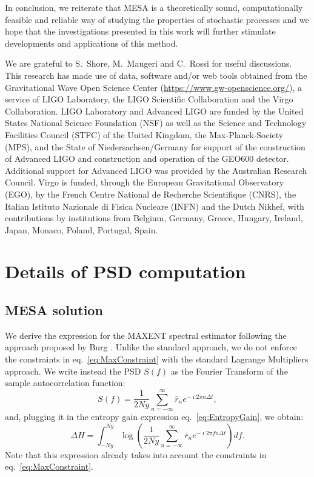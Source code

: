 \documentclass[twocolumn,showpacs,preprintnumbers,nofootinbib,prd,
superscriptaddress,10pt]{revtex4-1}
\begin{document}
In conclusion, we reiterate that MESA is a theoretically sound, computationally feasible and reliable way of studying the properties of stochastic processes and we hope that the investigations presented in this work will further stimulate developments and applications of this method.


\begin{acknowledgments}
We are grateful to S.~Shore, M.~Maugeri and C.~Rossi for useful discussions.\\
This research has made use of data, software and/or web tools obtained from the Gravitational Wave Open Science Center (\url{https://www.gw-openscience.org/}), a service of LIGO Laboratory, the LIGO Scientific Collaboration and the Virgo Collaboration. LIGO Laboratory and Advanced LIGO are funded by the United States National Science Foundation (NSF) as well as the Science and Technology Facilities Council (STFC) of the United Kingdom, the Max-Planck-Society (MPS), and the State of Niedersachsen/Germany for support of the construction of Advanced LIGO and construction and operation of the GEO600 detector. Additional support for Advanced LIGO was provided by the Australian Research Council. Virgo is funded, through the European Gravitational Observatory (EGO), by the French Centre National de Recherche Scientifique (CNRS), the Italian Istituto Nazionale di Fisica Nucleare (INFN) and the Dutch Nikhef, with contributions by institutions from Belgium, Germany, Greece, Hungary, Ireland, Japan, Monaco, Poland, Portugal, Spain.
\end{acknowledgments}

\pagebreak
\appendix
\section{Details of PSD computation} \label{sec:appendix}
\subsection{MESA solution}\label{sec:MESA_solution}
We derive the expression for the MAXENT spectral estimator following the approach proposed by Burg \cite{burg1975maximum}.
Unlike the standard approach, we do not enforce the constraints in eq.~\eqref{eq:MaxConstraint} with the standard Lagrange Multipliers approach.
We write instead the PSD $S(f)$ as the Fourier Transform of the sample autocorrelation function: 
\begin{equation}
    S(f) = \frac{1}{2 Ny}\sum_{n = -\infty}^{\infty} \bar r_n e^{- \imath 2 \pi n \Delta t},
\end{equation}
and, plugging it in the entropy gain expression eq.~\eqref{eq:EntropyGain}, we obtain:
\begin{equation}
    \Delta H = \int_{-Ny}^{Ny}  
    \log\left(\frac{1}{2 Ny}\sum_{n = -\infty}^{\infty} \bar r_n e^{-\imath 2 \pi f n \Delta t} 
    \right) df.
\end{equation}
Note that this expression already takes into account the constraints in eq.~\eqref{eq:MaxConstraint}.
\end{document}
